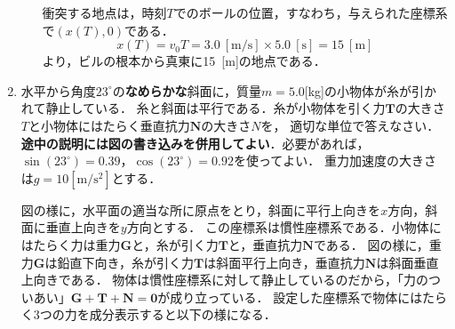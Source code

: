 \documentclass[a4paper,11pt]{ltjsarticle}
\begin{document}
\begin{enumerate}
\begin{enumerate}[label=(\arabic*)]
        衝突する地点は，時刻$T$でのボールの位置，すなわち，与えられた座標系で$(x(T),0)$である．
        \begin{equation*}
            x(T)=v_0T=3.0\ [\mathrm{m/s}] \times 5.0\ [\mathrm{s}]=15\ [\mathrm{m}]
        \end{equation*}
        より，ビルの根本から真東に15\ [m]の地点である．
        \vspace{5pt}
    \end{enumerate}

\clearpage

    \item 水平から角度$23^\circ$の\textbf{なめらかな}斜面に，質量$m=5.0$[kg]の小物体が糸が引かれて静止している．
    糸と斜面は平行である．糸が小物体を引く力$\bm{T}$の大きさ$T$と小物体にはたらく垂直抗力$\bm{N}$の大きさ$N$を，
    適切な単位で答えなさい．\textbf{途中の説明には図の書き込みを併用してよい}．必要があれば，$\sin(23^\circ)=0.39$，$\cos(23^\circ)=0.92$を使ってよい．
    重力加速度の大きさは$g=10[\mathrm{m/s^2}]$とする．

    \vspace{5pt}

    \begin{center}
        \end{center}

    \vspace{5pt}

    図の様に，水平面の適当な所に原点をとり，斜面に平行上向きを$x$方向，斜面に垂直上向きを$y$方向とする．
    この座標系は慣性座標系である．小物体にはたらく力は重力$\bm{G}$と，糸が引く力$\bm{T}$と，垂直抗力$\bm{N}$である．
    図の様に，重力$\bm{G}$は鉛直下向き，糸が引く力$\bm{T}$は斜面平行上向き，垂直抗力$\bm{N}$は斜面垂直上向きである．
    物体は慣性座標系に対して静止しているのだから，「力のついあい」$\bm{G}+\bm{T}+\bm{N}=\bm{0}$が成り立っている．
    設定した座標系で物体にはたらく3つの力を成分表示すると以下の様になる．


\end{enumerate}
\end{document}
